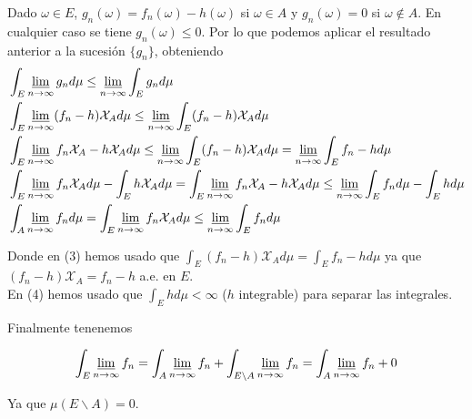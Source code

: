 \documentclass{article}
\begin{document}
Dado $\omega \in E$, $g_n(\omega)=f_n(\omega)-h(\omega)$ si
$\omega \in A$ y $g_n(\omega)=0$ si $\omega \notin A$. En cualquier
caso se tiene $g_n(\omega) \leq 0$. Por lo que podemos aplicar el
resultado anterior a la sucesión $\{g_n\}$, obteniendo
\begin{align}
  &\int_E\varliminf\limits_{n\to\infty} g_n d\mu \leq \varliminf\limits_{n\to\infty} \int_Eg_nd\mu \\
  &\int_E\varliminf\limits_{n\to\infty} (f_n-h)\mathcal{X}_A d\mu \leq \varliminf\limits_{n\to\infty} \int_E(f_n-h)\mathcal{X}_A d\mu \\
  &\int_E\varliminf\limits_{n\to\infty} f_n\mathcal{X}_A - h\mathcal{X}_A d\mu \leq \varliminf\limits_{n\to\infty} \int_E(f_n-h)\mathcal{X}_A d\mu = \varliminf\limits_{n\to\infty} \int_Ef_n-h d\mu \\
  &\int_E \varliminf\limits_{n\to\infty} f_n\mathcal{X}_A d\mu - \int_Eh\mathcal{X}_A d\mu = \int_E\varliminf\limits_{n\to\infty} f_n\mathcal{X}_A - h\mathcal{X}_A d\mu \leq \varliminf\limits_{n\to\infty} \int_Ef_n d\mu - \int_Eh d\mu \\
  &\int_A \varliminf\limits_{n\to\infty} f_n d\mu = \int_E \varliminf\limits_{n\to\infty} f_n\mathcal{X}_A d\mu \leq \varliminf\limits_{n\to\infty} \int_Ef_n d\mu
\end{align}

Donde en (3) hemos usado que
$\int_E(f_n-h)\mathcal{X}_A d\mu = \int_Ef_n-h d\mu$ ya que
$(f_n-h)\mathcal{X}_A = f_n-h$ a.e. en $E$. \\
En (4) hemos usado que $\int_Eh d\mu < \infty$ ($h$ integrable) para
separar las integrales.

Finalmente tenenemos

\[\int_E \varliminf\limits_{n\to\infty} f_n = \int_A \varliminf\limits_{n\to\infty} f_n + \int_{E\backslash A}\varliminf\limits_{n\to\infty} f_n = \int_A \varliminf\limits_{n\to\infty} f_n + 0\]

Ya que $\mu(E\backslash A)=0$.

\hfill\qedsymbol
\end{document}
